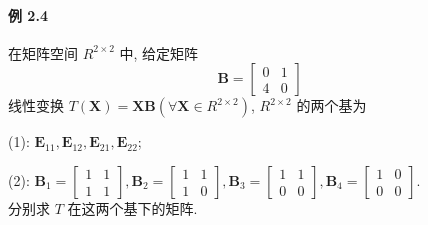\paragraph*{例 2.4} 在矩阵空间 $R^{2\times 2}$ 中, 给定矩阵
$$
    \bm{B} = \begin{bmatrix}
        0 & 1 \\
        4 & 0
    \end{bmatrix}
$$
线性变换 $T(\bm{X}) = \bm{XB}(\forall \bm{X} \in R^{2\times 2})$, $R^{2\times 2}$ 的两个基为
\par (1): $\bm{E}_{11}, \bm{E}_{12}, \bm{E}_{21}, \bm{E}_{22}$;
\par (2): $\bm{B}_1 = \begin{bmatrix}
        1 & 1 \\
        1 & 1
    \end{bmatrix}, \bm{B}_2 = \begin{bmatrix}
        1 & 1 \\
        1 & 0
    \end{bmatrix}, \bm{B}_3 = \begin{bmatrix}
        1 & 1 \\
        0 & 0
    \end{bmatrix}, \bm{B}_4 = \begin{bmatrix}
        1 & 0 \\
        0 & 0
    \end{bmatrix}$.
\\分别求 $T$ 在这两个基下的矩阵.

